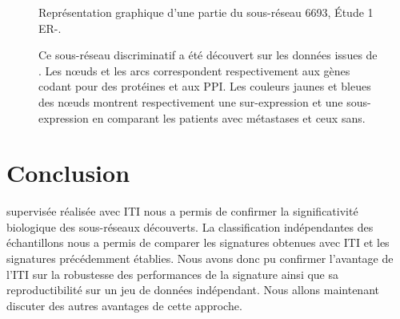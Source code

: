 			\begin{figure}
				\begin{center}
					\def\svgwidth{\columnwidth}
					\caption{Représentation graphique d'une partie du sous-réseau 6693, Étude 1 ER-.}
					\label{fig:Subnetwork6693}
					\caption*{Ce sous-réseau discriminatif a été découvert sur les données issues de \citet{Sabatier2011}.
					Les n{\oe}uds et les arcs correspondent respectivement aux gènes codant pour des protéines et aux \acs{PPI}.
					Les couleurs jaunes et bleues des n{\oe}uds montrent respectivement une sur-expression et une sous-expression en comparant les patients avec métastases et ceux sans.}
				\end{center}
			\end{figure}


\pagebreak
	\section{\textcolor{green!45!black}{Conclusion}}

	 supervisée réalisée avec ITI nous a permis de confirmer la significativité biologique des sous-réseaux découverts.
		La classification indépendantes des échantillons nous a permis de comparer les signatures obtenues avec ITI et les signatures précédemment établies.
		Nous avons donc pu confirmer l'avantage de l'ITI sur la robustesse des performances de la signature ainsi que sa reproductibilité sur un jeu de données indépendant.
		Nous allons maintenant discuter des autres avantages de cette approche.
